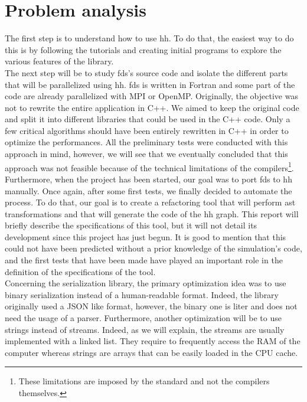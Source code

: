 
\clearpage{}
\section{Problem analysis}

The first step is to understand how to use \gls{hh}. To do that, the easiest way
to do this is by following the tutorials and creating initial programs to
explore the various features of the library.\\

The next step will be to study \gls{fds}'s source code and isolate the different
parts that will be parallelized using \gls{hh}. \gls{fds} is written in Fortran
and some part of the code are already parallelized with MPI or OpenMP.
Originally, the objective was not to rewrite the entire application in C++. We
aimed to keep the original code and split it into different libraries that could
be used in the C++ code. Only a few critical algorithms should have been
entirely rewritten in C++ in order to optimize the performances. All the
preliminary tests were conducted with this approach in mind, however, we will
see that we eventually concluded that this approach was not feasible because of
the technical limitations of the compilers\footnote{These limitations are
imposed by the standard and not the compilers themselves.}. Furthermore, when
the project has been started, our goal was to port \gls{fds} to \gls{hh}
manually. Once again, after some first tests, we finally decided to automate the
process. To do that, our goal is to create a refactoring tool that will perform
\gls{ast} transformations and that will generate the code of the \gls{hh} graph.
This report will briefly describe the specifications of this tool, but it will
not detail its development since this project has just begun. It is good to
mention that this could not have been predicted without a prior knowledge of the
simulation's code, and the first tests that have been made have played an
important role in the definition of the specifications of the tool.\\

Concerning the serialization library, the primary optimization idea was to use
binary serialization instead of a human-readable format. Indeed, the library
originally used a JSON like format, however, the binary one is liter and does
not need the usage of a \gls{parser}. Furthermore, another optimization will be
to use strings instead of streams. Indeed, as we will explain, the streams are
usually implemented with a linked list. They require to frequently access the
RAM of the computer whereas strings are arrays that can be easily loaded in the
CPU cache.\\

